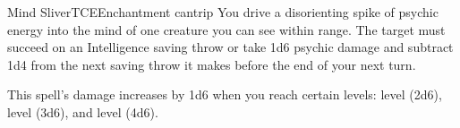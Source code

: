 \begin{spell}{Mind Sliver}{TCE}{Enchantment cantrip}
{
}
You drive a disorienting spike of psychic energy into
the mind of one creature you can see within range.
The target must succeed on an Intelligence saving
throw or take 1d6 psychic damage and subtract 1d4
from the next saving throw it makes before the end
of your next turn.

 This spell's damage increases by 1d6 when you
reach certain levels:  level (2d6),  level (3d6),
and  level (4d6).
\end{spell}
